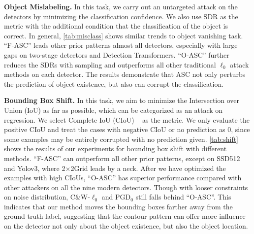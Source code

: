 \documentclass[times,twocolumn,final,authoryear]{elsarticle}
\begin{document}
\textbf{Object Mislabeling.} In this task, we carry out an untargeted attack on the detectors by minimizing the classification confidence. 
We also use SDR as the metric with the additional condition that the classification of the object is correct. In general, \cref{tab:misclass} shows similar trends to object vanishing task. ``F-ASC'' leads other prior patterns almost all detectors, especially with large gaps on two-stage detectors and Detection Transformers. ``O-ASC'' further reduces the SDRs with sampling and outperforms all other traditional $\ell_0$ attack methods on each detector. The results demonstrate that ASC not only perturbs the prediction of object existence, but also can corrupt the classification.



\textbf{Bounding Box Shift.} In this task, we aim to minimize the Intersection over Union (IoU) as far as possible, which can be categorized as an attack on regression. We select Complete IoU (CIoU) ~\citep{zheng2020distance} as the metric. We only evaluate the positive CIoU and treat the cases with negative CIoU or no prediction as 0, since some examples may be entirely corrupted with no prediction given. \cref{tab:shift} shows the results of our experiments for bounding box shift with different methods. ``F-ASC'' can outperform all other prior patterns, except on SSD512 and Yolov3, where 2$\times$2Grid leads by a neck. After we have optimized the examples with high CIoUs, ``O-ASC'' has superior performance compared with other attackers on all the nine modern detectors. Though with looser constraints on noise distribution, C\&W-$\ell_0$ and PGD$_0$ still falls behind ``O-ASC''. This indicates that our method moves the bounding boxes farther away from the ground-truth label, suggesting that the contour pattern can offer more influence on the detector not only about the object existence, but also the object location. 
\end{document}
